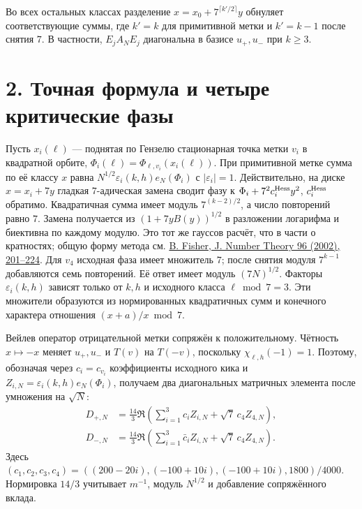 \documentclass[11pt,a4paper]{article}
\newcommand{\sect}[1]{\section*{\sffamily\color{ink}#1}}
\begin{document}
Во всех остальных классах разделение \(x=x_0+7^{\lceil k'/2\rceil}y\) обнуляет соответствующие суммы, где \(k'=k\) для примитивной метки и \(k'=k-1\) после снятия \(7\). В частности, \(E_j A_N E_j\) диагональна в базисе \(u_+,u_-\) при \(k\ge3\).
\newpage
\sect{2. Точная формула и четыре критические фазы}
Пусть \(x_i(\ell)\) --- поднятая по Гензелю стационарная точка метки \(v_i\) в квадратной орбите, \(\Phi_i(\ell)=\Phi_{\ell,v_i}(x_i(\ell))\). При примитивной метке сумма по её классу \(x\) равна \(N^{1/2}\varepsilon_i(k,h)e_N(\Phi_i)\) с \(|\varepsilon_i|=1\). Действительно, на диске \(x=x_i+7y\) гладкая \(7\)-адическая замена сводит фазу к \(\Phi_i+7^2 c_i^{\rm Hess}y^2\), \(c_i^{\rm Hess}\) обратимо. Квадратичная сумма имеет модуль \(7^{(k-2)/2}\), а число повторений равно \(7\). Замена получается из \((1+7y B(y))^{1/2}\) в разложении логарифма и биективна по каждому модулю. Это тот же гауссов расчёт, что в части о кратностях; общую форму метода см. \href{https://doi.org/10.1006/jnth.2002.2790}{B. Fisher, J. Number Theory 96 (2002), 201--224}. Для \(v_4\) исходная фаза имеет множитель \(7\); после снятия модуля \(7^{k-1}\) добавляются семь повторений. Её ответ имеет модуль \((7N)^{1/2}\). Факторы \(\varepsilon_i(k,h)\) зависят только от \(k,h\) и исходного класса \(\ell\bmod7=3\). Эти множители образуются из нормированных квадратичных сумм и конечного характера отношения \((x+a)/x\bmod7\).

Вейлев оператор отрицательной метки сопряжён к положительному. Чётность \(x\mapsto-x\) меняет \(u_+,u_-\) и \(T(v)\) на \(T(-v)\), поскольку \(\chi_{\ell,h}(-1)=1\). Поэтому, обозначая через \(c_i=c_{v_i}\) коэффициенты исходного кика и \(Z_{i,N}=\varepsilon_i(k,h)e_N(\Phi_i)\), получаем два диагональных матричных элемента после умножения на \(\sqrt N\):
\begin{equation}
 \begin{aligned}
 D_{+,N}&=\frac{14}{3}\Re\left(\sum_{i=1}^3 c_i Z_{i,N}
                                           +\sqrt7\,c_4Z_{4,N}\right),\\
 D_{-,N}&=\frac{14}{3}\Re\left(\sum_{i=1}^3 \bar c_i Z_{i,N}
                                           +\sqrt7\,c_4Z_{4,N}\right).
 \end{aligned}                                                   \tag{1}
\end{equation}
Здесь \((c_1,c_2,c_3,c_4)=((200-20i),(-100+10i),(-100+10i),1800)/4000\). Нормировка \(14/3\) учитывает \(m^{-1}\), модуль \(N^{1/2}\) и добавление сопряжённого вклада.
\end{document}
